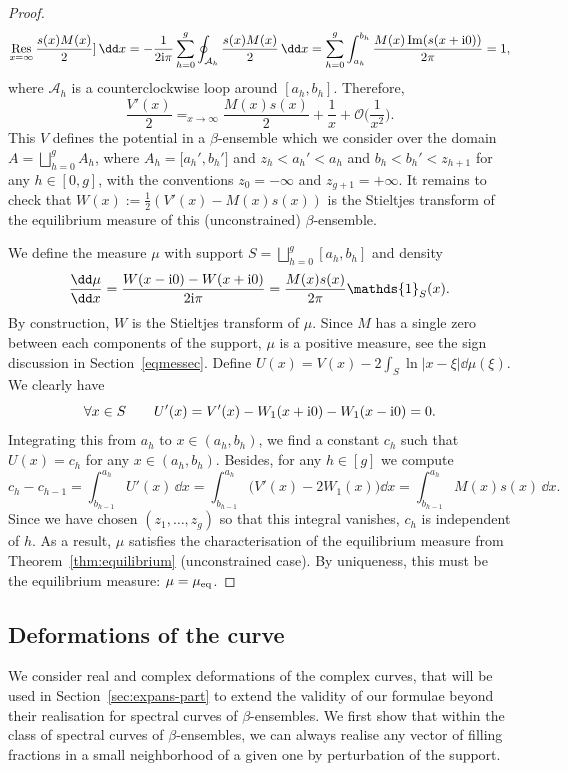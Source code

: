 \documentclass[pdftex]{sigma}
\numberwithin{equation}{section}
\newcommand{\ind}{\mathds{1}}
\begin{document}
\begin{proof}
\[
\mathop{\text{Res}}_{x = \infty} \frac{s(x)M(x)}{2}]\, \dd x = -\frac{1}{2{\rm i}\pi} \sum_{h = 0}^{g} \oint_{\mathcal{A}_h} \frac{s(x)M(x)}{2}\, \dd x = \sum_{h = 0}^{g} \int_{a_h}^{b_h} \frac{M(x) \operatorname{Im}(s(x + {\rm i}0))}{2\pi} = 1,
\]
where $\mathcal{A}_h$ is a counterclockwise loop around $[a_h,b_h]$. Therefore,
\[
\frac{V'(x)}{2} \mathop{\mathop{=}}_{x \rightarrow \infty} \frac{M(x)s(x)}{2} + \frac{1}{x} + \mathcal{O}\biggl(\frac{1}{x^2}\biggr).
\]
This $V$ defines the potential in a $\beta$-ensemble which we consider over the domain $A = \bigsqcup_{h = 0}^{g} A_h$, where $A_h = \bigl[a_h',b_h'\bigr]$ and $z_{h} < a_h' < a_h$ and $b_h < b_h' < z_{h + 1}$ for any $h \in [0,g]$, with the conventions $z_0 = -\infty$ and $z_{g + 1} = +\infty$. It remains to check that $W(x) := \frac{1}{2}(V'(x) - M(x)s(x))$ is the Stieltjes transform of the equilibrium measure of this (unconstrained) $\beta$-ensemble.



We define the measure $\mu$ with support $S = \bigsqcup_{h = 0}^{g} [a_h,b_h]$ and density
\[
\frac{\dd\mu}{\dd x} = \frac{W(x - {\rm i}0) - W(x + {\rm i}0)}{2{\rm i}\pi} = \frac{M(x)s(x)}{2\pi} \ind_S(x).
\]
By construction, $W$ is the Stieltjes transform of $\mu$. Since $M$ has a single zero between each components of the support, $\mu$ is a positive measure, see the sign discussion in Section~\ref{eqmessec}. Define $U(x) = V(x) - 2\int_{S} \ln|x - \xi|\dd \mu(\xi)$. We clearly have
\[
\forall x \in S \qquad U'(x) = V'(x) - W_1(x + {\rm i}0) - W_1(x - {\rm i}0) = 0.
\]
Integrating this from $a_{h}$ to $x \in (a_h,b_h)$, we find a constant $c_h$ such that $U(x) = c_h$ for any $x \in (a_h,b_h)$. Besides, for any $h \in [g]$ we compute
\[
c_{h} - c_{h - 1} = \int_{b_{h - 1}}^{a_h} U'(x)\, \dd x = \int_{b_{h - 1}}^{a_h}\bigl(V'(x) - 2W_1(x)\bigr)\dd x = \int_{b_{h - 1}}^{a_{h}} M(x)s(x) \,\dd x.
\]
Since we have chosen $(z_1,\ldots,z_g)$ so that this integral vanishes, $c_h$ is independent of $h$. As a result, $\mu$ satisfies the characterisation of the equilibrium measure from Theorem~\ref{thm:equilibrium} (unconstrained case). By uniqueness, this must be the equilibrium measure: $\mu = \mu_{{\rm eq}}$.
\end{proof}


\subsection{Deformations of the curve}

We consider real and complex deformations of the complex curves, that will be used in Section~\ref{sec:expans-part} to extend the validity of our formulae beyond their realisation for spectral curves of $\beta$-ensembles. We first show that within the class of spectral curves of $\beta$-ensembles, we can always realise any vector of filling fractions in a small neighborhood of a given one by perturbation of the support.
\end{document}
